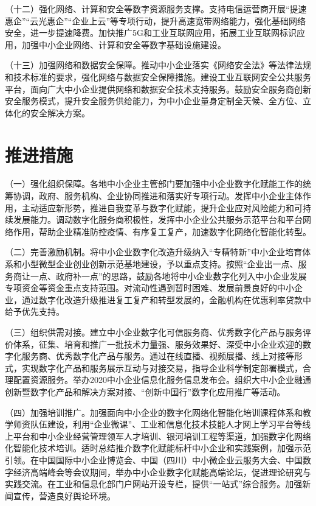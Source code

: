 （十二）强化网络、计算和安全等数字资源服务支撑。支持电信运营商开展“提速惠企”“云光惠企”“企业上云”等专项行动，提升高速宽带网络能力，强化基础网络安全，进一步提速降费。加快推广5G和工业互联网应用，拓展工业互联网标识应用，加强中小企业网络、计算和安全等数字基础设施建设。

（十三）加强网络和数据安全保障。推动中小企业落实《网络安全法》等法律法规和技术标准的要求，强化网络与数据安全保障措施。建设工业互联网安全公共服务平台，面向广大中小企业提供网络和数据安全技术支持服务。鼓励安全服务商创新安全服务模式，提升安全服务供给能力，为中小企业量身定制全天候、全方位、立体化的安全解决方案。

\section{推进措施}

（一）强化组织保障。各地中小企业主管部门要加强中小企业数字化赋能工作的统筹协调，政府、服务机构、企业协同推进和落实好专项行动。发挥中小企业主体作用，主动适应新形势，推进自我变革与数字化赋能，提升企业应对风险能力和可持续发展能力。调动数字化服务商积极性，发挥中小企业公共服务示范平台和平台网络作用，帮助企业精准防控疫情、有序复工复产，加速数字化网络化智能化转型。

（二）完善激励机制。将中小企业数字化改造升级纳入“专精特新”中小企业培育体系和小型微型企业创业创新示范基地建设，予以重点支持。按照“企业出一点、服务商让一点、政府补一点”的思路，鼓励各地将中小企业数字化列入中小企业发展专项资金等资金重点支持范围。对流动性遇到暂时困难、发展前景良好的中小企业，通过数字化改造升级推进复工复产和转型发展的，金融机构在优惠利率贷款中给予优先支持。

（三）组织供需对接。建立中小企业数字化可信服务商、优秀数字化产品与服务评价体系，征集、培育和推广一批技术力量强、服务效果好、深受中小企业欢迎的数字化服务商、优秀数字化产品与服务。通过在线直播、视频展播、线上对接等形式，实现数字化产品和服务展示互动与对接交易，指导企业科学制定部署模式，合理配置资源服务。举办2020中小企业信息化服务信息发布会。组织大中小企业融通创新暨数字化产品和解决方案对接、“创新中国行”数字化应用推广等活动。

（四）加强培训推广。加强面向中小企业的数字化网络化智能化培训课程体系和教学师资队伍建设，利用“企业微课”、工业和信息化技术技能人才网上学习平台等线上平台和中小企业经营管理领军人才培训、银河培训工程等渠道，加强数字化网络化智能化技术培训。适时总结推介数字化赋能标杆中小企业和实践案例，加强示范引领。在中国国际中小企业博览会、中国（四川）中小微企业云服务大会、中国数字经济高端峰会等会议期间，举办中小企业数字化赋能高端论坛，促进理论研究与实践交流。在工业和信息化部门户网站开设专栏，提供“一站式”综合服务。加强新闻宣传，营造良好舆论环境。
